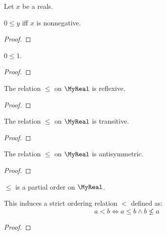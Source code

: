 \begin{lemma}
    \leanok
    Let $x$ be a reals.

    $0 \leq y$ iff $x$ is nonnegative.
\end{lemma}
\begin{proof}
    \leanok
\end{proof}

\begin{lemma}
    \leanok
    $0 \leq 1$.
\end{lemma}
\begin{proof}
    \leanok
\end{proof}

\begin{lemma}
    \leanok
    The relation $\leq$ on $\MyReal$ is reflexive.
\end{lemma}
\begin{proof}
    \leanok
\end{proof}

\begin{lemma}
    \leanok
    The relation $\leq$ on $\MyReal$ is transitive.
\end{lemma}
\begin{proof}
    \leanok
\end{proof}

\begin{lemma}
    \leanok
    The relation $\leq$ on $\MyReal$ is antisymmetric.
\end{lemma}
\begin{proof}
    \leanok
\end{proof}

\begin{proposition}
    \leanok
    $\leq$ is a partial order on $\MyReal$.

    This induces a strict ordering relation $<$ defined as:
    \[
        a < b \iff a \leq b ∧ b \not\leq a
    \]
\end{proposition}
\begin{proof}
    \leanok
\end{proof}

